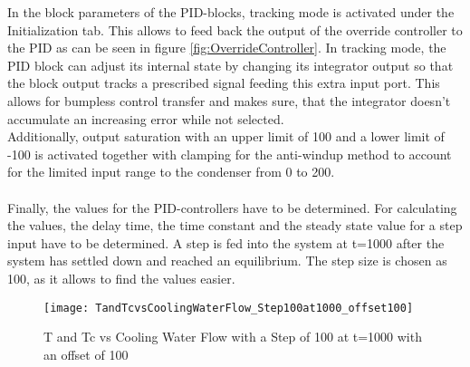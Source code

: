 In the block parameters of the PID-blocks, tracking mode is activated under the Initialization tab. This allows to feed back the output of the override controller to the PID as can be seen in figure \ref{fig:OverrideController}.  
In tracking mode, the PID block can adjust its internal state by changing its integrator output so that the block output tracks a prescribed signal feeding this extra input port.
This allows for bumpless control transfer and makes sure, that the integrator doesn't accumulate an increasing error while not selected.\\
Additionally, output saturation  with an upper limit of 100 and a lower limit of -100 is activated together with clamping for the anti-windup method to account for the limited input range to the condenser from 0 to 200.\\
\\
Finally, the values for the PID-controllers have to be determined. For calculating the values, the delay time, the time constant and the steady state value for a step input have to be determined.
A step is fed into the system at t=1000 after the system has settled down and reached an equilibrium. The step size is chosen as 100, as it allows to find the values easier.

\begin{figure}[H]
	\centering
	\texttt{[image: TandTcvsCoolingWaterFlow\_Step100at1000\_offset100]}
	\caption{T and Tc vs Cooling Water Flow with a Step of 100 at t=1000 with an offset of 100}
	\label{fig:StepResponse}
\end{figure}

